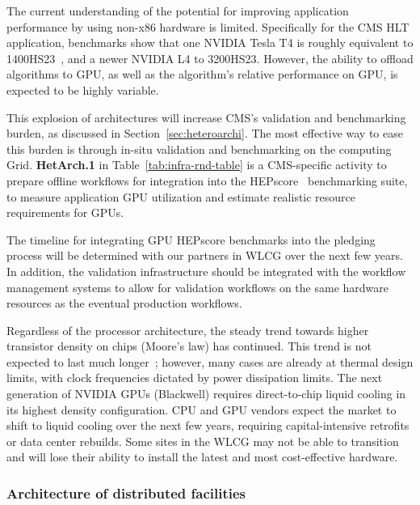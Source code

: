 The current understanding of the potential for improving application performance by using non-x86 hardware is limited. Specifically for the CMS \gls{HLT} application, benchmarks show that one NVIDIA Tesla T4 is roughly equivalent to 1400\unit{HS23}~\cite{alpaka:bocci}, and a newer NVIDIA L4 to 3200\unit{HS23}. However, the ability to offload algorithms to \gls{GPU}, as well as the algorithm's relative performance on \gls{GPU}, is expected to be highly variable.

This explosion of architectures will increase CMS’s validation and benchmarking burden, as discussed in Section~\ref{sec:heteroarchi}. The most effective way to ease this burden is through in-situ validation and benchmarking on the computing Grid. \textbf{HetArch.1} in Table~\ref{tab:infra-rnd-table} is a CMS-specific activity to prepare offline workflows for integration into the HEPscore~\cite{Giordano:2023vnv} benchmarking suite, to measure application \gls{GPU} utilization and estimate realistic resource requirements for \glspl{GPU}. 

The timeline for integrating \gls{GPU} HEPscore benchmarks into the pledging process will be determined with our partners in \gls{WLCG} over the next few years. In addition, the validation infrastructure should be integrated with the workflow management systems to allow for validation workflows on the same hardware resources as the eventual production workflows.

Regardless of the processor architecture, the steady trend towards higher transistor density on chips (Moore's law) has continued. This trend is not expected to last much longer~\cite{hutchby2002extending,kumar2015fundamentallimitsmooreslaw}; however, many cases are already at thermal design limits, with clock frequencies dictated by power dissipation limits. The next generation of NVIDIA \glspl{GPU} (Blackwell) requires direct-to-chip liquid cooling in its highest density configuration. \gls{CPU} and \gls{GPU} vendors expect the market to shift to liquid cooling over the next few years, requiring capital-intensive retrofits or data center rebuilds. Some sites in the \gls{WLCG} may not be able to transition and will lose their ability to install the latest and most cost-effective hardware.

\subsubsection{Architecture of distributed facilities}
\label{sec:distributed-facilities}

